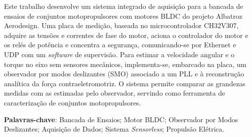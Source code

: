 
\setlength{\absparsep}{18pt} %
\begin{resumo}
Este trabalho desenvolve um sistema integrado de aquisição para a bancada de ensaios de conjuntos motopropulsores com motores BLDC do projeto Albatroz Aerodesign. Uma placa de medição, baseada no microcontrolador CH32V307, adquire as tensões e correntes de fase do motor, aciona o controlador do motor e os relés de potência e concentra a segurança, comunicando-se por Ethernet e UDP com um \textit{software} de supervisão. Para estimar a velocidade angular e o torque no eixo sem sensores mecânicos, implementa-se, embarcado na placa, um observador por modos deslizantes (SMO) associado a um PLL e à reconstrução analítica da força contraeletromotriz. O sistema permite comparar as grandezas medidas com as estimadas pelo observador, servindo como ferramenta de caracterização de conjuntos motopropulsores.

 \textbf{Palavras-chave}: Bancada de Ensaios; Motor BLDC; Observador por Modos Deslizantes; Aquisição de Dados; Sistema \textit{Sensorless}; Propulsão Elétrica.
\end{resumo}
